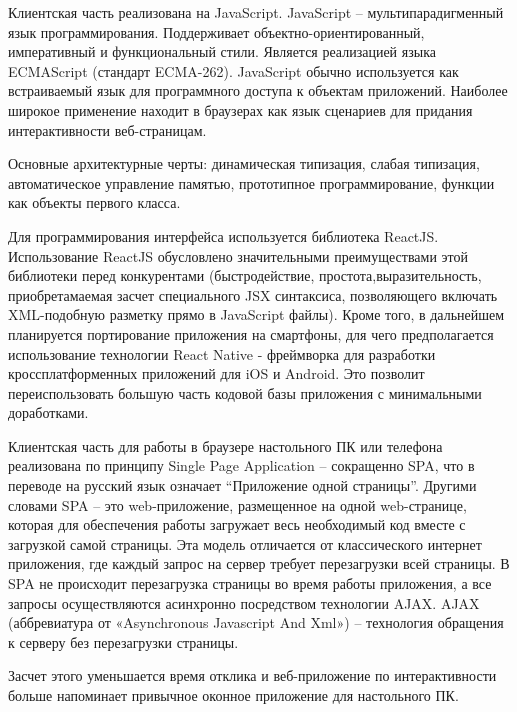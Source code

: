 \documentclass[12pt]{article}
\begin{document}
Клиентская часть реализована на JavaScript. JavaScript – мультипарадигменный язык программирования. Поддерживает объектно-ориентированный, императивный и функциональный стили. Является реализацией языка ECMAScript (стандарт ECMA-262). JavaScript обычно используется как встраиваемый язык для программного доступа к объектам приложений. Наиболее широкое применение находит в браузерах как язык сценариев для придания интерактивности веб-страницам.

Основные архитектурные черты: динамическая типизация, слабая типизация, автоматическое управление памятью, прототипное программирование, функции как объекты первого класса.

Для программирования интерфейса используется библиотека ReactJS. Использование ReactJS обусловлено значительными преимуществами этой библиотеки перед конкурентами (быстродействие, простота,выразительность, приобретамаемая засчет специального JSX синтаксиса, позволяющего включать XML-подобную разметку прямо в JavaScript файлы). Кроме того, в дальнейшем планируется портирование приложения на смартфоны, для чего предполагается использование технологии React Native - фреймворка для разработки кроссплатформенных приложений для iOS и Android. Это позволит переиспользовать большую часть кодовой базы приложения с минимальными доработками.

Клиентская часть для работы в браузере настольного ПК или телефона реализована по принципу Single Page Application – сокращенно SPA, что в переводе на русский язык означает “Приложение одной страницы”. Другими словами SPA – это web-приложение, размещенное на одной web-странице, которая для обеспечения работы загружает весь необходимый код вместе с загрузкой самой страницы. Эта модель отличается от классического интернет приложения, где каждый запрос на сервер требует перезагрузки всей страницы. В SPA не происходит перезагрузка страницы во время работы приложения, а все запросы осуществляются асинхронно посредством технологии AJAX. AJAX (аббревиатура от «Asynchronous Javascript And Xml») – технология обращения к серверу без перезагрузки страницы. 

Засчет этого уменьшается время отклика и веб-приложение по интерактивности больше напоминает привычное оконное приложение для настольного ПК. 
\end{document}
